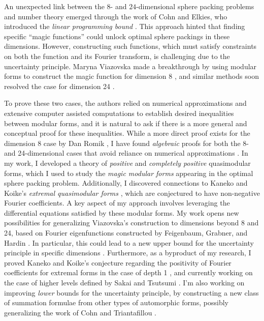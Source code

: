\documentclass[letterpaper, 10pt]{article}
\begin{document}
An unexpected link between the $8$- and $24$-dimensional sphere packing problems and number theory emerged through the work of Cohn and Elkies, who introduced the \emph{linear programming bound} \cite{cohn2003new}. 
This approach hinted that finding specific ``magic functions'' could unlock optimal sphere packings in these dimensions.
However, constructing such functions, which must satisfy constraints on both the function and its Fourier transform, is challenging due to the uncertainty principle.
Maryna Viazovska made a breakthrough by using modular forms to construct the magic function for dimension 8 \cite{viazovska2017sphere}, and similar methods soon resolved the case for dimension 24 \cite{cohn2017sphere}.

To prove these two cases, the authors \cite{viazovska2017sphere,cohn2017sphere} relied on numerical approximations and extensive computer assisted computations to establish desired inequalities between modular forms, and it is natural to ask if there is a more general and conceptual proof for these inequalities.
While a more direct proof exists for the dimension 8 case by Dan Romik \cite{romik2023viazovska}, I have found \emph{algebraic} proofs for both the 8- and 24-dimensional cases that avoid reliance on numerical approximations \cite{lee2024algebraic}.
In my work, I developed a theory of \emph{positive} and \emph{completely positive} quasimodular forms, which I used to study the \emph{magic modular forms} appearing in the optimal sphere packing problem. 
Additionally, I discovered connections to Kaneko and Koike's \emph{extremal quasimodular forms} \cite{kaneko2006extremal}, which are conjectured to have non-negative Fourier coefficients.
A key aspect of my approach involves leveraging the differential equations satisfied by these modular forms.
My work opens new possibilities for generalizing Viazovska's construction to dimensions beyond 8 and 24, based on Fourier eigenfunctions constructed by Feigenbaum, Grabner, and Hardin \cite{feigenbaum2021eigenfunctions}.
In particular, this could lead to a new upper bound for the uncertainty principle in specific dimensions \cite{bourgain2010principe}.
Furthermore, as a byproduct of my research, I proved Kaneko and Koike's conjecture regarding the positivity of Fourier coefficients for extremal forms in the case of depth 1 \cite{kaneko2006extremal}, and currently working on the case of higher levels defined by Sakai and Tsutsumi \cite{sakai2012extremal}.
I'm also working on improving \emph{lower} bounds for the uncertainty principle, by constructing a new class of summation formulae from other types of automorphic forms, possibly generalizing the work of Cohn and Triantafillou \cite{cohn2022dual}.
\end{document}

